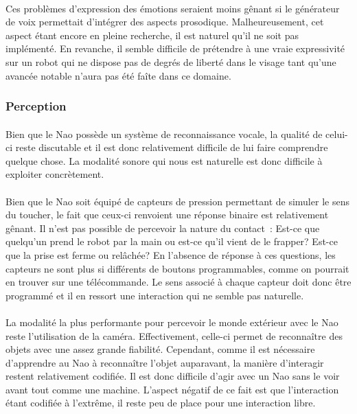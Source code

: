 \paragraph{}
Ces problèmes d'expression des émotions seraient moins gênant si le
générateur de voix permettait d'intégrer des aspects prosodique.
Malheureusement, cet aspect étant encore en pleine recherche, il est naturel
qu'il ne soit pas implémenté. En revanche, il semble difficile de prétendre
à une vraie expressivité sur un robot qui ne dispose pas de degrés de
liberté dans le visage tant qu'une avancée notable n'aura pas été faîte
dans ce domaine.

\subsubsection{Perception}
\paragraph{}
Bien que le Nao possède un système de reconnaissance vocale, la qualité de
celui-ci reste discutable et il est donc relativement difficile de lui
faire comprendre quelque chose. La modalité sonore qui nous est
naturelle est donc difficile à exploiter concrètement.

\paragraph{}
Bien que le Nao soit équipé de capteurs de pression permettant de simuler le
sens du toucher, le fait que ceux-ci renvoient une réponse binaire est
relativement gênant. Il n'est pas possible de percevoir la nature du
contact~: Est-ce que quelqu'un prend le robot par la main ou est-ce qu'il
vient de le frapper? Est-ce que la prise est ferme ou relâchée? En l'absence
de réponse à ces questions, les capteurs ne sont plus si différents de
boutons programmables, comme on pourrait en trouver sur une télécommande.
Le sens associé à chaque capteur doit donc être programmé et il en ressort
une interaction qui ne semble pas naturelle.

\paragraph{}
La modalité la plus performante pour percevoir le monde extérieur avec le Nao
reste l'utilisation de la caméra. Effectivement, celle-ci permet de reconnaître
des objets avec une assez grande fiabilité. Cependant, comme il est nécessaire
d'apprendre au Nao à reconnaître l'objet auparavant, la manière d'interagir
restent relativement codifiée. Il est donc difficile d'agir avec un Nao sans le
voir avant tout comme une machine. L'aspect négatif de ce fait est que
l'interaction étant codifiée à l'extrême, il reste peu de place pour une
interaction libre.
